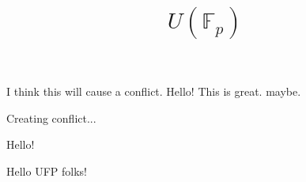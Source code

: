 \documentclass{amsart}
\begin{document}
I think this will cause a conflict. 
 Hello! This is great. maybe. 


    \title{$U(\mathbb{F}_p)$}

Creating conflict...

    \maketitle

 Hello!

 Hello UFP folks!
\end{document}
